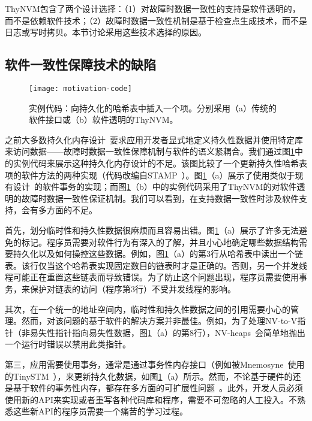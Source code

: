 ThyNVM包含了两个设计选择：（1）对故障时数据一致性的支持是软件透明的，而不是依赖软件技术；（2）故障时数据一致性机制是基于检查点生成技术，而不是日志或写时拷贝。本节讨论采用这些技术选择的原因。

\subsection{软件一致性保障技术的缺陷}

\begin{figure}[!h]
\centering \texttt{[image: motivation-code]}
  \caption{实例代码：向持久化的哈希表中插入一个项。分别采用（a）传统的软件接口或（b）软件透明的ThyNVM。}
\label{fig:motivation-code}
\end{figure}

之前大多数持久化内存设计~\cite{Condit:2009:BIT:1629575.1629589, Volos:2011:MLP:1950365.1950379, Coburn:2011:NMP:1950365.1950380, Zhao:2013:KCP:2540708.2540744, Venkataraman:2011:CDD:1960475.1960480}要求应用开发者显式地定义持久性数据并使用特定库来访问数据——故障时数据一致性保障机制与软件的语义紧耦合。我们通过图\ref{fig:motivation-code}中的实例代码来展示这种持久化内存设计的不足。该图比较了一个更新持久性哈希表项的软件方法的两种实现（代码改编自STAMP~\cite{Cao:2008:STA}）。图\ref{fig:motivation-code}（a）展示了使用类似于现有设计~\cite{Condit:2009:BIT:1629575.1629589, Volos:2011:MLP:1950365.1950379}的软件事务的实现；而图\ref{fig:motivation-code}（b）中的实例代码采用了ThyNVM的对软件透明的故障时数据一致性保证机制。我们可以看到，在支持数据一致性时涉及软件支持，会有多方面的不足。

首先，划分临时性和持久性数据很麻烦而且容易出错。图\ref{fig:motivation-code}（a）展示了许多无法避免的标记。程序员需要对软件行为有深入的了解，并且小心地确定哪些数据结构需要持久化以及如何操控这些数据。例如，图\ref{fig:motivation-code}（a）的第3行从哈希表中读出一个链表。该行仅当这个哈希表实现固定数目的链表时才是正确的。否则，另一个并发线程可能正在重置这些链表而导致错误。为了防止这个问题出现，程序员需要使用事务，来保护对链表的访问（程序第3行）不受并发线程的影响。

其次，在一个统一的地址空间内，临时性和持久性数据之间的引用需要小心的管理。然而，对该问题的基于软件的解决方案并非最佳。例如，为了处理NV-to-V指针（非易失性指针指向易失性数据，图\ref{fig:motivation-code}（a）的第8行），NV-heaps~\cite{Coburn:2011:NMP:1950365.1950380}会简单地抛出一个运行时错误以禁用此类指针。

第三，应用需要使用事务，通常是通过事务性内存接口（例如被Mnemosyne~\cite{Volos:2011:MLP:1950365.1950379}使用的TinySTM~\cite{Felber:2008:DPT}），来更新持久化数据，如图\ref{fig:motivation-code}（a）所示。然而，不论基于硬件的还是基于软件的事务性内存，都存在多方面的可扩展性问题~\cite{Cascaval:2008:STM:1454456.1454466, Pankratius:2011:STM:1989493.1989500, Dice:2009:EEC:1508244.1508263}。此外，开发人员必须使用新的API来实现或者重写各种代码库和程序，需要不可忽略的人工投入。不熟悉这些新API的程序员需要一个痛苦的学习过程。

